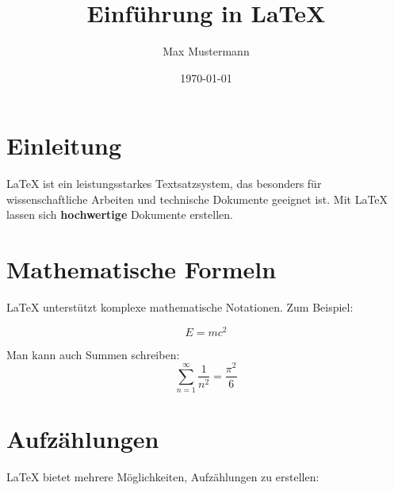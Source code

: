 \documentclass[a4paper,12pt]{article} %
\begin{document}
\title{Einführung in LaTeX} %
\author{Max Mustermann}   %
\date{\today}            %

\maketitle %

\section{Einleitung}
LaTeX ist ein leistungsstarkes Textsatzsystem, das besonders für wissenschaftliche Arbeiten und technische Dokumente geeignet ist. Mit LaTeX lassen sich \textbf{hochwertige} Dokumente erstellen.

\section{Mathematische Formeln}
LaTeX unterstützt komplexe mathematische Notationen. Zum Beispiel:

\begin{equation}
    E = mc^2
\end{equation}

Man kann auch Summen schreiben:
\[
    \sum_{n=1}^{\infty} \frac{1}{n^2} = \frac{\pi^2}{6}
\]

\section{Aufzählungen}
LaTeX bietet mehrere Möglichkeiten, Aufzählungen zu erstellen:
\end{document}
